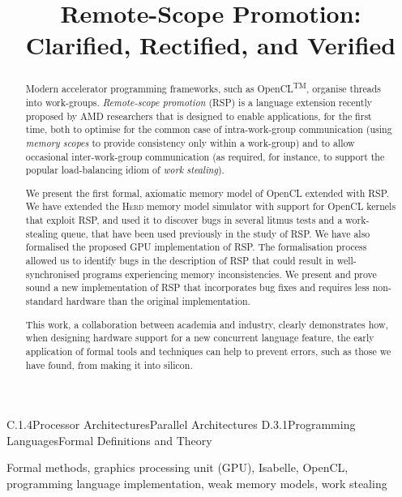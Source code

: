\documentclass[svgnames,10pt]{sigplanconf}
\title{Remote-Scope Promotion: Clarified, Rectified, and Verified}
\theoremstyle{definition}
\newcommand\herd{\textsc{Herd}}
\begin{document}
\toappear{}

\maketitle

\begin{abstract}

Modern accelerator programming frameworks, such as
\mbox{OpenCL\textsuperscript{TM}}, organise threads into
work-groups. \emph{Remote-scope promotion} (RSP) is a language
extension recently proposed by AMD researchers that is designed to enable
applications, for the first time, both to optimise for the common case
of intra-work-group communication (using \emph{memory scopes} to
provide consistency only within a work-group) and to allow
occasional inter-work-group communication (as required, for instance,
to support the popular load-balancing idiom of \emph{work stealing}).

We present the first formal, axiomatic memory model of OpenCL extended
with RSP.
We have extended the \herd{} memory model simulator with
support for OpenCL kernels that exploit RSP, and used it to discover
bugs in several litmus tests and a work-stealing queue, 
that have been used previously in the study of RSP.
%
We have also formalised the proposed GPU
implementation of RSP.
%
The formalisation process allowed us to identify bugs in the description of RSP
that could result in
well-synchronised programs experiencing memory inconsistencies.
We present and prove sound a new implementation of RSP that
incorporates bug fixes and requires less non-standard hardware than the original
implementation.

This work, a collaboration between academia and industry, clearly
demonstrates how, when designing hardware support for a new concurrent
language feature, the early application of formal tools and techniques
can help to prevent errors, such as those we have found, from making it into silicon.

\end{abstract}

\category
{C.1.4}{Processor Architectures}{Parallel Architectures}
\category 
{D.3.1}{Programming Languages}{Formal Definitions and Theory}


\keywords
Formal methods, 
graphics processing unit (GPU),
Isabelle, 
OpenCL,  
programming language implementation, 
weak memory models,
work stealing

\makeatletter
\WithSuffix\newcommand\paragraph*[1]{ \hspace*{0pt}}
\makeatother
\end{document}
